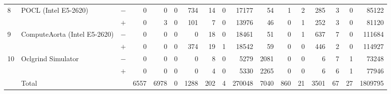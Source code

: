 \begin{tabular}{lll | rrrrrrr | rrrrrrr }
\hline
\multirow{ 2}{*}{8} & \multirow{ 2}{*}{POCL (Intel E5-2620)} & $-$ & 0 & 0 & 0 & 734 & 14 & 0 & 17177       & 54 & 1 & 2 & 285 & 3 & 0 & 85122 \\& & $+$ & 0 & 3 & 0 & 101 & 7 & 0 & 13976 & 46 & 0 & 1 & 252 & 3 & 0 & 81120 \\
\hline
\multirow{ 2}{*}{9} & \multirow{ 2}{*}{ComputeAorta (Intel E5-2620)} & $-$ & 0 & 0 & 0 & 0 & 18 & 0 & 18461       & 51 & 0 & 1 & 637 & 7 & 0 & 111684 \\& & $+$ & 0 & 0 & 0 & 374 & 19 & 1 & 18542 & 59 & 0 & 0 & 446 & 2 & 0 & 114927 \\
\hline
\multirow{ 2}{*}{10} & \multirow{ 2}{*}{Oclgrind Simulator} & $-$ & 0 & 0 & 0 & 0 & 8 & 0 & 5279       & 2081 & 0 & 0 & 6 & 7 & 1 & 73248 \\& & $+$ & 0 & 0 & 0 & 0 & 4 & 0 & 5330 & 2265 & 0 & 0 & 6 & 6 & 1 & 77946 \\
  \midrule
  
\multirow{ 2}{*}{} & \multirow{ 2}{*}{Total} & \multirow{ 2}{*}{} &
\multirow{ 2}{*}{6557} & \multirow{ 2}{*}{6978} & \multirow{ 2}{*}{0} & \multirow{ 2}{*}{1288} & \multirow{ 2}{*}{202} & \multirow{ 2}{*}{4} & \multirow{ 2}{*}{270048} & \multirow{ 2}{*}{7040} & \multirow{ 2}{*}{860} & \multirow{ 2}{*}{21} & \multirow{ 2}{*}{3501} & \multirow{ 2}{*}{67} & \multirow{ 2}{*}{27} & \multirow{ 2}{*}{1809795} \\
\\

  \bottomrule
\end{tabular}

